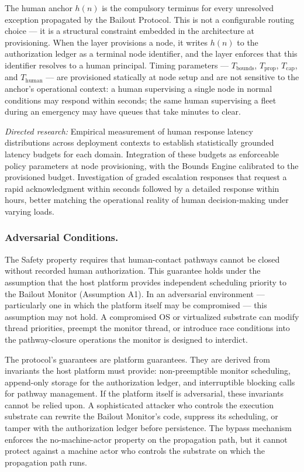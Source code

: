 The human anchor $h(n)$ is the compulsory terminus for every unresolved exception propagated by the Bailout Protocol. This is not a configurable routing choice --- it is a structural constraint embedded in the architecture at provisioning. When the \purpose{} layer provisions a node, it writes $h(n)$ to the authorization ledger as a terminal node identifier, and the \fact{} layer enforces that this identifier resolves to a human principal. Timing parameters --- $T_{\mathrm{bounds}}$, $T_{\mathrm{prop}}$, $T_{\mathrm{cap}}$, and $T_{\mathrm{human}}$ --- are provisioned statically at node setup and are not sensitive to the anchor's operational context: a human supervising a single node in normal conditions may respond within seconds; the same human supervising a fleet during an emergency may have queues that take minutes to clear.

\textit{Directed research:} Empirical measurement of human response latency distributions across deployment contexts to establish statistically grounded latency budgets for each domain. Integration of these budgets as enforceable policy parameters at node provisioning, with the Bounds Engine calibrated to the provisioned budget. Investigation of graded escalation responses that request a rapid acknowledgment within seconds followed by a detailed response within hours, better matching the operational reality of human decision-making under varying loads.

\subsubsection{Adversarial Conditions.}

The Safety property requires that human-contact pathways cannot be closed without recorded human authorization. This guarantee holds under the assumption that the host platform provides independent scheduling priority to the Bailout Monitor (Assumption A1). In an adversarial environment --- particularly one in which the platform itself may be compromised --- this assumption may not hold. A compromised OS or virtualized substrate can modify thread priorities, preempt the monitor thread, or introduce race conditions into the pathway-closure operations the monitor is designed to interdict.

The protocol's guarantees are platform guarantees. They are derived from invariants the host platform must provide: non-preemptible monitor scheduling, append-only storage for the authorization ledger, and interruptible blocking calls for pathway management. If the platform itself is adversarial, these invariants cannot be relied upon. A sophisticated attacker who controls the execution substrate can rewrite the Bailout Monitor's code, suppress its scheduling, or tamper with the authorization ledger before persistence. The bypass mechanism enforces the no-machine-actor property on the propagation path, but it cannot protect against a machine actor who controls the substrate on which the propagation path runs.


